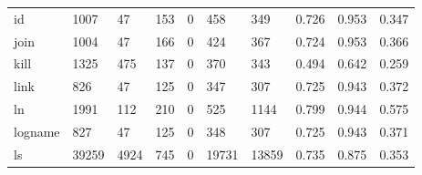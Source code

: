 \begin{longtable}{lp{1.3cm}p{1.3cm}p{1.3cm}p{1.3cm}p{1.3cm}p{1.3cm}p{1.3cm}p{1.3cm}p{1.3cm}}
id        &                   1007 &                                 47 &                               153 &                                0 &                               458 &                             349 &                                   0.726 &                                  0.953 &                                0.347 \\
join      &                   1004 &                                 47 &                               166 &                                0 &                               424 &                             367 &                                   0.724 &                                  0.953 &                                0.366 \\
kill      &                   1325 &                                475 &                               137 &                                0 &                               370 &                             343 &                                   0.494 &                                  0.642 &                                0.259 \\
link      &                    826 &                                 47 &                               125 &                                0 &                               347 &                             307 &                                   0.725 &                                  0.943 &                                0.372 \\
ln        &                   1991 &                                112 &                               210 &                                0 &                               525 &                            1144 &                                   0.799 &                                  0.944 &                                0.575 \\
logname   &                    827 &                                 47 &                               125 &                                0 &                               348 &                             307 &                                   0.725 &                                  0.943 &                                0.371 \\
ls        &                  39259 &                               4924 &                               745 &                                0 &                             19731 &                           13859 &                                   0.735 &                                  0.875 &                                0.353 \\

\end{longtable}
